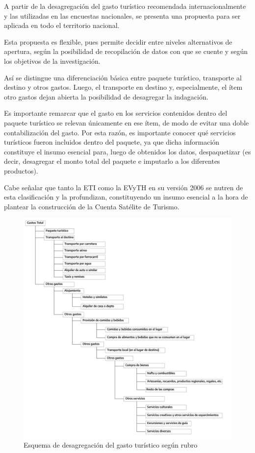 \documentclass[
]{book}
\begin{document}
A partir de la desagregación del gasto turístico recomendada internacionalmente y las utilizadas en las encuestas nacionales, se presenta una propuesta para ser aplicada en todo el territorio nacional.

Esta propuesta es flexible, pues permite decidir entre niveles alternativos de apertura, según la posibilidad de recopilación de datos con que se cuente y según los objetivos de la investigación.

Así se distingue una diferenciación básica entre paquete turístico, transporte al destino y otros gastos. Luego, el transporte en destino y, especialmente, el ítem otro gastos dejan abierta la posibilidad de desagregar la indagación.

Es importante remarcar que el gasto en los servicios contenidos dentro del paquete turístico se relevan únicamente en ese ítem, de modo de evitar una doble contabilización del gasto. Por esta razón, es importante conocer qué servicios turísticos fueron incluidos dentro del paquete, ya que dicha información constituye el insumo esencial para, luego de obtenidos los datos, despaquetizar (es decir, desagregar el monto total del paquete e imputarlo a los diferentes productos).

Cabe señalar que tanto la ETI como la EVyTH en su versión 2006 se nutren de esta clasificación y la profundizan, constituyendo un insumo esencial a la hora de plantear la construcción de la Cuenta Satélite de Turismo.

\begin{figure}

{\centering \includegraphics[width=1\linewidth]{imagenes/figura_3} 

}

\caption{Esquema de desagregación del gasto turístico según rubro}\label{fig:Gastototal}
\end{figure}
\end{document}
